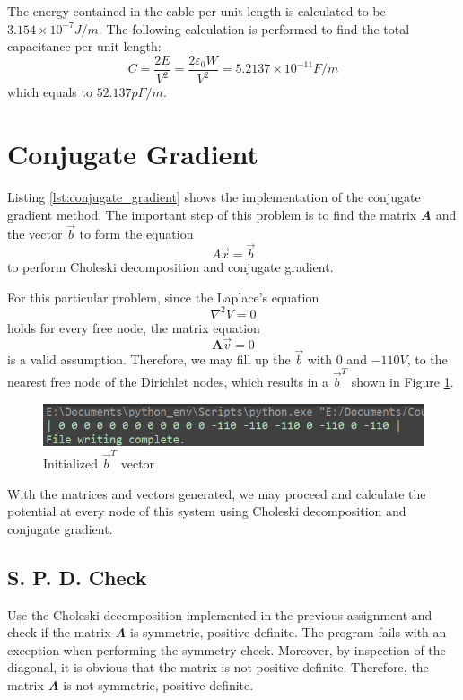 \documentclass[a4paper,titlepage]{article}
\begin{document}
			The energy contained in the cable per unit length is calculated to be $3.154\times 10^{-7}J/m$. The following calculation is performed to find the total capacitance per unit length:
			$$
				C = \frac{2E}{V^2} = \frac{2\varepsilon_0 W}{V^2} = 5.2137\times 10^{-11}F/m
			$$
			which equals to $52.137pF/m$.
			
		\section{Conjugate Gradient}
			Listing \ref{lst:conjugate_gradient} shows the implementation of the conjugate gradient method. The important step of this problem is to find the matrix \textbf{\textit{A}} and the vector $\vec{b}$ to form the equation
			$$
				A\vec{x} = \vec{b}
			$$
			to perform Choleski decomposition and conjugate gradient.
			
			For this particular problem, since the Laplace's equation
			\begin{equation}
				\nabla ^2V = 0
			\end{equation}
			holds for every free node, the matrix equation
			$$
				\textbf{A}\vec{v} = 0
			$$
			is a valid assumption. Therefore, we may fill up the $\vec{b}$ with 0 and $-110V$, to the nearest free node of the Dirichlet nodes, which results in a $\vec{b}^T$ shown in Figure \ref{v_T}.
			\begin{figure}[!h]
				\centering
				\includegraphics[width=0.7\linewidth]{v_T}
				\caption{Initialized $\vec{b}^T$ vector}
				\label{v_T}
			\end{figure}
		
			With the matrices and vectors generated, we may proceed and calculate the potential at every node of this system using Choleski decomposition and conjugate gradient. 
			
			\subsection{S. P. D. Check}
				Use the Choleski decomposition implemented in the previous assignment and check if the matrix \textbf{\textit{A}} is symmetric, positive definite. The program fails with an exception when performing the symmetry check. Moreover, by inspection of the diagonal, it is obvious that the matrix is not positive definite. Therefore, the matrix \textit{\textbf{A}} is not symmetric, positive definite. 
				
\end{document}
